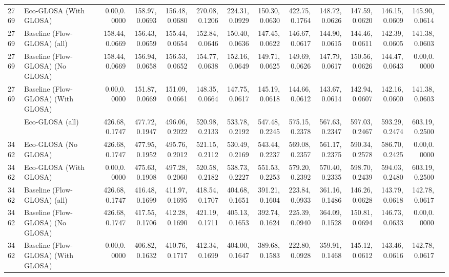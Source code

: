\begin{table}[ht]
{\begin{tabular}{llrrrrrrrrrrrr}
      2769 & Eco-GLOSA (With GLOSA)     &   0.00,0.0000 & 158.97,0.0693 & 156.48,0.0680 & 270.08,0.1206 & 224.31,0.0929 & 150.30,0.0630 & 422.75,0.1764 & 148.72,0.0626 & 147.59,0.0620 & 146.15,0.0609 & 145.90,0.0614 \\
      2769 & Baseline (Flow-GLOSA) (all)   & 158.44,0.0669 & 156.43,0.0659 & 155.44,0.0654 & 152.84,0.0646 & 150.40,0.0636 & 147.45,0.0622 & 146.67,0.0617 & 144.90,0.0615 & 144.46,0.0611 & 142.39,0.0605 & 141.38,0.0603 \\
      2769 & Baseline (Flow-GLOSA) (No GLOSA) & 158.44,0.0669 & 156.94,0.0658 & 156.53,0.0652 & 154.77,0.0638 & 152.16,0.0649 & 149.71,0.0625 & 149.69,0.0626 & 147.79,0.0617 & 150.56,0.0626 & 144.47,0.0643 &   0.00,0.0000 \\
      2769 & Baseline (Flow-GLOSA) (With GLOSA) &   0.00,0.0000 & 151.87,0.0669 & 151.09,0.0661 & 148.35,0.0664 & 147.75,0.0617 & 145.19,0.0618 & 144.66,0.0612 & 143.67,0.0614 & 142.94,0.0607 & 142.16,0.0600 & 141.38,0.0603 \\
      \addlinespace
      3462 & Eco-GLOSA (all)            & 426.68,0.1747 & 477.72,0.1947 & 496.06,0.2022 & 520.98,0.2133 & 533.78,0.2192 & 547.48,0.2245 & 575.15,0.2378 & 567.63,0.2347 & 597.03,0.2467 & 593.29,0.2474 & 603.19,0.2500 \\
      3462 & Eco-GLOSA (No GLOSA)       & 426.68,0.1747 & 477.95,0.1952 & 495.76,0.2012 & 521.15,0.2112 & 530.49,0.2169 & 543.44,0.2237 & 569.08,0.2357 & 561.17,0.2375 & 590.34,0.2578 & 586.70,0.2425 &   0.00,0.0000 \\
      3462 & Eco-GLOSA (With GLOSA)     &   0.00,0.0000 & 475.63,0.1908 & 497.28,0.2060 & 520.58,0.2182 & 538.73,0.2227 & 551.53,0.2253 & 579.20,0.2392 & 570.40,0.2335 & 598.70,0.2439 & 594.03,0.2480 & 603.19,0.2500 \\
      3462 & Baseline (Flow-GLOSA) (all)   & 426.68,0.1747 & 416.48,0.1699 & 411.97,0.1695 & 418.54,0.1707 & 404.68,0.1651 & 391.21,0.1604 & 223.84,0.0933 & 361.16,0.1486 & 146.26,0.0628 & 143.79,0.0618 & 142.78,0.0617 \\
      3462 & Baseline (Flow-GLOSA) (No GLOSA) & 426.68,0.1747 & 417.55,0.1706 & 412.28,0.1690 & 421.19,0.1711 & 405.13,0.1653 & 392.74,0.1624 & 225.39,0.0940 & 364.09,0.1528 & 150.81,0.0694 & 146.73,0.0633 &   0.00,0.0000 \\
      3462 & Baseline (Flow-GLOSA) (With GLOSA) &   0.00,0.0000 & 406.82,0.1632 & 410.76,0.1717 & 412.34,0.1699 & 404.00,0.1647 & 389.68,0.1583 & 222.80,0.0928 & 359.91,0.1468 & 145.12,0.0612 & 143.46,0.0616 & 142.78,0.0617 \\
      \bottomrule
    \end{tabular}%
  }
\end{table}

